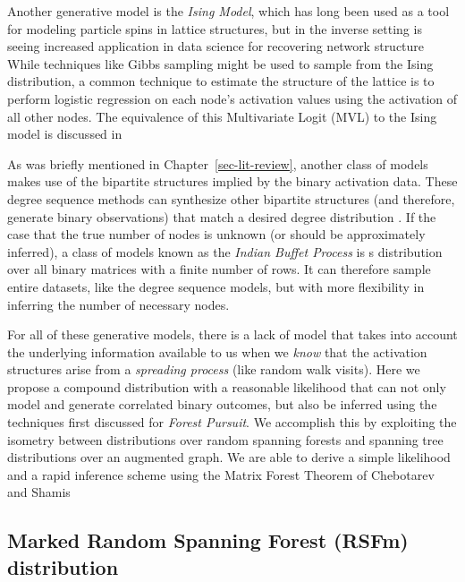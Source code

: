 \documentclass[%
	12pt,
		oneside,
		letterpaper
]{book}
\begin{document}
Another generative model is the \emph{Ising Model}, which has long been used as a tool for modeling particle spins in lattice structures, but in the inverse setting is seeing increased application in data science for recovering network structure \autocite{Inversestatisticalproblems_Nguyen2017}
While techniques like Gibbs sampling might be used to sample from the Ising distribution, a common technique to estimate the structure of the lattice is to perform logistic regression on each node's activation values using the activation of all other nodes.
The equivalence of this Multivariate Logit (MVL) to the Ising model is discussed in \textcite{Assortmentoptimizationgiven_Vasilyev2025}

As was briefly mentioned in Chapter~\ref{sec-lit-review}, another class of models makes use of the bipartite structures implied by the binary activation data.
These degree sequence methods can synthesize other bipartite structures (and therefore, generate binary observations) that match a desired degree distribution \autocite{fastballfastalgorithm_Godard2022,Randomlysamplingbipartite_Neal2023}.
If the case that the true number of nodes is unknown (or should be approximately inferred), a class of models known as the \emph{Indian Buffet Process} \autocite{IndianBuffetProcess_Griffiths2011} is s distribution over all binary matrices with a finite number of rows.
It can therefore sample entire datasets, like the degree sequence models, but with more flexibility in inferring the number of necessary nodes.

For all of these generative models, there is a lack of model that takes into account the underlying information available to us when we \emph{know} that the activation structures arise from a \emph{spreading process} (like random walk visits).
Here we propose a compound distribution with a reasonable likelihood that can not only model and generate correlated binary outcomes, but also be inferred using the techniques first discussed for \emph{Forest Pursuit}.
We accomplish this by exploiting the isometry between distributions over random spanning forests and spanning tree distributions over an augmented graph.
We are able to derive a simple likelihood and a rapid inference scheme using the Matrix Forest Theorem of Chebotarev and Shamis \autocite{MatrixForestTheorem_Chebotarev2006}

\subsection{Marked Random Spanning Forest (RSFm) distribution}\label{marked-random-spanning-forest-rsfm-distribution}
\end{document}
